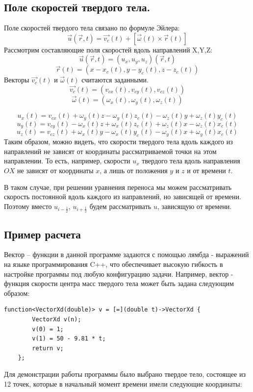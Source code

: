 \documentclass[12pt,a4paper]{article}
\begin{document}
\subsection{Поле скоростей твердого тела.}
\label{sec:RBVF}
Поле скоростей твердого тела связано по формуле Эйлера:
\[
\overrightarrow{u}(\overrightarrow{r},t)=\overrightarrow{v_c}(t)+[\overrightarrow{\omega}(t)\times \overrightarrow{r}(t)]
\]
Рассмотрим составляющие поля скоростей вдоль направлений X,Y,Z:
\[ \overrightarrow{u}(\overrightarrow{r},t)=(u_x, u_y, u_z)(\overrightarrow{r},t) \]
\[ \overrightarrow{r}(t)=(x-x_c(t), y-y_c(t), z-z_c(t)) \]
Векторы $\overrightarrow{v_c}(t)$ и $\overrightarrow{\omega}(t)$ считаются заданными.
\[ \overrightarrow{v_c}(t)=(v_{cx}(t), v_{cy}(t), v_{cz}(t)) \]
\[ \overrightarrow{\omega}(t)=(\omega_x(t), \omega_y(t), \omega_z(t)) \]

\[ u_x(t)=v_{cx}(t)+\omega_y(t)z-\omega_y(t)z_c(t)-\omega_z(t)y+\omega_z(t)y_c(t) \]
\[ u_y(t)=v_{cy}(t)-\omega_x(t)z+\omega_x(t)z_c(t)+\omega_z(t)x-\omega_z(t)x_c(t) \]
\[ u_z(t)=v_{cz}(t)+\omega_x(t)y-\omega_x(t)y_c(t)-\omega_y(t)x+\omega_y(t)x_c(t) \]
Таким образом, можно видеть, что скорости твердого тела вдоль каждого из направлений не зависят от координаты рассматриваемой точки на этом направлении. То есть, например, скорости $u_x$ твердого тела вдоль направления $OX$ не зависят от координаты $x$, а лишь от положения $y$ и $z$ и от времени $t$.

В таком случае, при решении уравнения переноса мы можем рассматривать скорость постоянной вдоль каждого из направлений, но зависящей от времени. Поэтому вместо $u_{i-\frac{1}{2}}$, $u_{i+\frac{1}{2}}$ будем рассматривать $u$, зависящую от времени.

\subsection{Пример расчета}
Вектор – функции в данной программе задаются с помощью лямбда - выражений на языке программирования C++, что обеспечивает высокую гибкость в настройке программы под любую конфигурацию задачи. Например, вектор - функция скорости центра масс твердого тела может быть задана следующим образом:
\begin{lstlisting}
function<VectorXd(double)> v = [=](double t)->VectorXd {
        VectorXd v(n);
        v(0) = 1;
        v(1) = 50 - 9.81 * t;
        return v;
    };
\end{lstlisting}
Для демонстрации работы программы было выбрано твердое тело, состоящее из 12 точек, которые в начальный момент времени имели следующие координаты:
\end{document}
